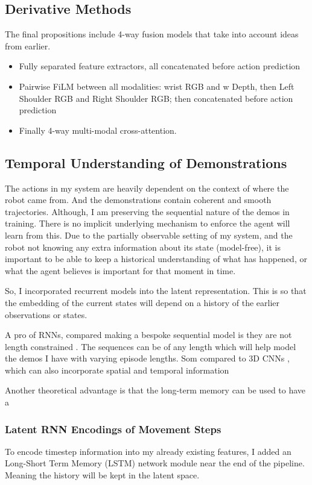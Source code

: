 \subsection{Derivative Methods}
The final propositions include 4-way fusion models that take into account ideas from earlier.
\begin{itemize}
  \item Fully separated feature extractors, all concatenated before action prediction 
  \item Pairwise FiLM between all modalities: wrist RGB and w Depth, then Left Shoulder RGB and Right Shoulder RGB; then concatenated before action prediction
  \item Finally 4-way multi-modal cross-attention. 
\end{itemize}

\subsection{Temporal Understanding of Demonstrations}
The actions in my system are heavily dependent on the context of where the robot came from. And the demonstrations contain coherent and smooth trajectories. Although, I am preserving the sequential nature of the demos in training. There is no implicit underlying mechanism to enforce the agent will learn from this. Due to the partially observable setting of my system, and the robot not knowing any extra information about its state (model-free), it is important to be able to keep a historical understanding of what has happened, or what the agent believes is important for that moment in time.

So, I incorporated recurrent models into the latent representation. This is so that the embedding of the current states will depend on a history of the earlier observations or states.

A pro of RNNs, compared making a bespoke sequential model is they are not length constrained . The sequences can be of any length which will help model the demos I have with varying episode lengths. Som compared to 3D CNNs , which can also incorporate spatial and temporal information 


Another theoretical advantage is that the long-term memory can be used to have a 

\subsubsection{Latent RNN Encodings of Movement Steps}
To encode timestep information into my already existing features, I added an Long-Short Term Memory (LSTM) network module near the end of the pipeline. Meaning the history will be kept in the latent space.

